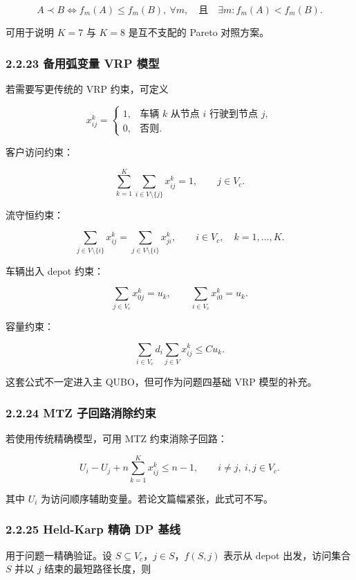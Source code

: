 \documentclass[
  a4paper,
]{ctexart}
\begin{document}
\[
A\prec B
\iff
f_m(A)\le f_m(B),\ \forall m,
\quad \text{且}\quad
\exists m:f_m(A)<f_m(B).
\]

可用于说明 \(K=7\) 与 \(K=8\) 是互不支配的 Pareto 对照方案。

\subsubsection{2.2.23 备用弧变量 VRP
模型}\label{ux5907ux7528ux5f27ux53d8ux91cf-vrp-ux6a21ux578b}

若需要写更传统的 VRP 约束，可定义

\[
x_{ij}^k=\begin{cases}
1, & \text{车辆 }k\text{ 从节点 }i\text{ 行驶到节点 }j,\\
0, & \text{否则}.
\end{cases}
\]

客户访问约束：

\[
\sum_{k=1}^{K}\sum_{i\in V\setminus\{j\}}x_{ij}^k=1,
\qquad j\in V_c.
\]

流守恒约束：

\[
\sum_{j\in V\setminus\{i\}}x_{ij}^k=
\sum_{j\in V\setminus\{i\}}x_{ji}^k,
\qquad i\in V_c,\quad k=1,\ldots,K.
\]

车辆出入 depot 约束：

\[
\sum_{j\in V_c}x_{0j}^k=u_k,
\qquad
\sum_{i\in V_c}x_{i0}^k=u_k.
\]

容量约束：

\[
\sum_{i\in V_c}d_i\sum_{j\in V}x_{ij}^k\le C u_k.
\]

这套公式不一定进入主 QUBO，但可作为问题四基础 VRP 模型的补充。

\subsubsection{2.2.24 MTZ
子回路消除约束}\label{mtz-ux5b50ux56deux8defux6d88ux9664ux7ea6ux675f}

若使用传统精确模型，可用 MTZ 约束消除子回路：

\[
U_i-U_j+n\sum_{k=1}^{K}x_{ij}^k\le n-1,
\qquad i\ne j,\ i,j\in V_c.
\]

其中 \(U_i\) 为访问顺序辅助变量。若论文篇幅紧张，此式可不写。

\subsubsection{2.2.25 Held-Karp 精确 DP
基线}\label{held-karp-ux7cbeux786e-dp-ux57faux7ebf}

用于问题一精确验证。设 \(S\subseteq V_c\)，\(j\in S\)，\(f(S,j)\) 表示从
depot 出发，访问集合 \(S\) 并以 \(j\) 结束的最短路径长度，则
\end{document}
